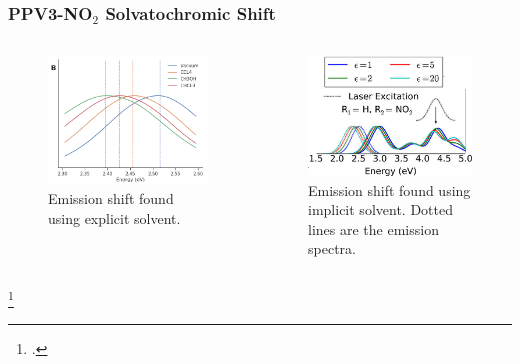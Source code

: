 \documentclass{beamer}
\begin{document}
\begin{frame}
  \frametitle{PPV3-NO$_2$ Solvatochromic Shift }
\begin{columns}[b]
 \begin{figure}
  \includegraphics[width=\textwidth]{Images/spectra_compared.png}
  \caption{Emission shift found using explicit solvent.}
 \end{figure}
 \begin{figure}
  \includegraphics[width=\textwidth]{Images/sifain.jpeg}
  \caption{Emission shift found using implicit solvent. Dotted lines are the emission
    spectra. \footnotemark }
 \end{figure}
\end{columns}
\footcitetext{sifain2018photoexcited}
\end{frame}
\end{document}
